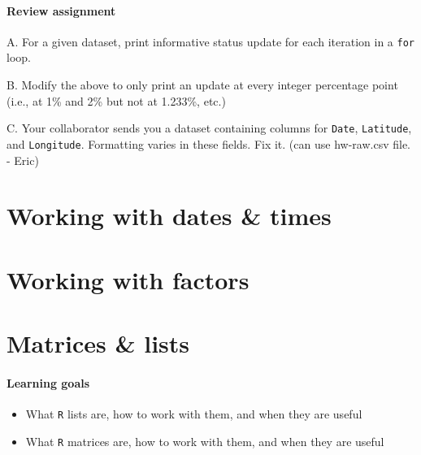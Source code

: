 \documentclass[
]{book}
\providecommand{\tightlist}{%
  \setlength{\itemsep}{0pt}\setlength{\parskip}{0pt}}
\begin{document}
\hypertarget{review-assignment-9}{%
\subsubsection*{Review assignment}\label{review-assignment-9}}

A. For a given dataset, print informative status update for each iteration in a \texttt{for} loop.

B. Modify the above to only print an update at every integer percentage point (i.e., at 1\% and 2\% but not at 1.233\%, etc.)

C. Your collaborator sends you a dataset containing columns for \texttt{Date}, \texttt{Latitude}, and \texttt{Longitude}. Formatting varies in these fields. Fix it. (can use hw-raw.csv file. - Eric)

\hypertarget{working-with-dates-times}{%
\chapter{Working with dates \& times}\label{working-with-dates-times}}

\hypertarget{working-with-factors}{%
\chapter{Working with factors}\label{working-with-factors}}

\hypertarget{matrices-lists}{%
\chapter{Matrices \& lists}\label{matrices-lists}}

\hypertarget{learning-goals-18}{%
\subsubsection*{Learning goals}\label{learning-goals-18}}

\begin{itemize}
\tightlist
\item
  What \texttt{R} lists are, how to work with them, and when they are useful\\
\item
  What \texttt{R} matrices are, how to work with them, and when they are useful
\end{itemize}

~
\end{document}
